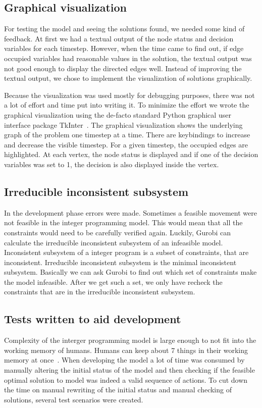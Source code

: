 \subsection{Graphical visualization}
For testing the model and seeing the solutions found, we needed some kind of
feedback. At first we had a textual output of the node status and decision
variables for each timestep.
However, when the time came to find out, if edge occupied variables had
reasonable values in the solution, the textual output was not good enough to
display the directed edges well. Instead of improving the textual output, we
chose to implement the visualization of solutions graphically.

Because the visualization was used mostly for debugging purposes, there was not
a lot of effort and time put into writing it. To minimize the effort we wrote
the graphical visualization using the de-facto standard Python graphical user
interface package TkInter~\cite{tkinter}. The graphical visualization shows the
underlying graph of the problem one timestep at a time. There are keybindings
to increase and decrease the visible timestep. For a given timestep, the
occupied edges are highlighted. At each vertex, the node status is displayed
and if one of the decision variables was set to 1, the decision is also displayed
inside the vertex.
\subsection{Irreducible inconsistent subsystem}
In the development phase errors were made. Sometimes a feasible movement were
not feasible in the integer programming model. This would mean that all the
constraints would need to be carefully verified again. Luckily, Gurobi can
calculate the irreducible inconsistent subsystem of an infeasible model.
Inconsistent subsystem of a integer program is a subset of constraints, that
are inconsistent. Irreducible inconsistent subsystem is the minimal
inconsistent subsystem. Basically we can ask Gurobi to find out which set of
constraints make the model infeasible. After we get such a set, we only have
recheck the constraints that are in the irreducible inconsistent subsystem.
\subsection{Tests written to aid development}
Complexity of the interger programming model is large enough to not fit into
the working memory of humans. Humans can keep about 7 things in their working
memory at once~\cite{magic7}. When developing the model a lot of time was
consumed by manually altering the initial status of the model and then checking
if the feasible optimal solution to model was indeed a valid sequence of
actions. To cut down the time on manual rewriting of the initial status and
manual checking of solutions, several test scenarios were created.

